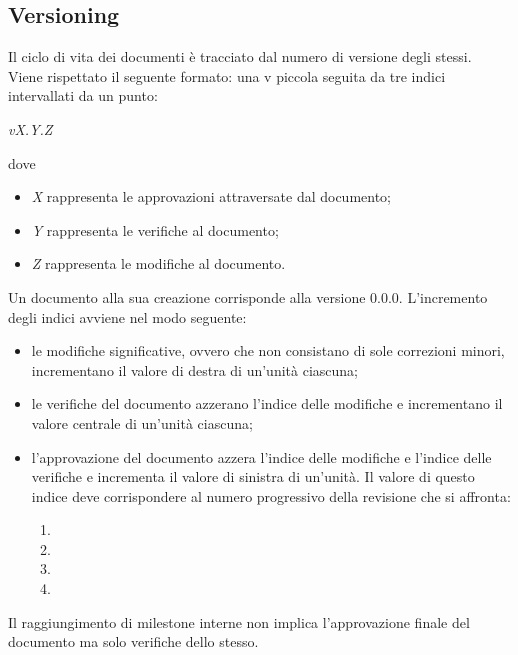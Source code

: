\subsection{Versioning}
Il ciclo di vita dei documenti è tracciato dal numero di versione degli stessi.\\
Viene rispettato il seguente formato: una v piccola seguita da tre indici intervallati da un punto:
\begin{center}
	\textit{vX.Y.Z}
\end{center}
dove
\begin{itemize}
	\item \textit{X} rappresenta le approvazioni attraversate dal documento;
	\item \textit{Y} rappresenta le verifiche al documento;
	\item \textit{Z} rappresenta le modifiche al documento.
\end{itemize}
Un documento alla sua creazione corrisponde alla versione 0.0.0. L’incremento degli indici avviene nel modo seguente:
\begin{itemize}
	\item le modifiche significative, ovvero che non consistano di sole correzioni minori, incrementano il valore di destra di un'unità ciascuna;
	\item le verifiche del documento azzerano l'indice delle modifiche e incrementano il valore centrale di un'unità ciascuna;
	\item l'approvazione del documento azzera l'indice delle modifiche e l'indice delle verifiche e incrementa il valore di sinistra di un'unità. Il valore di questo indice deve corrispondere al numero progressivo della revisione che si affronta:
	\begin{enumerate}
		\item \RR
		\item \RP
		\item \RQ
		\item \RA
	\end{enumerate} 
\end{itemize}
Il raggiungimento di milestone interne non implica l'approvazione finale del documento ma solo verifiche dello stesso.

